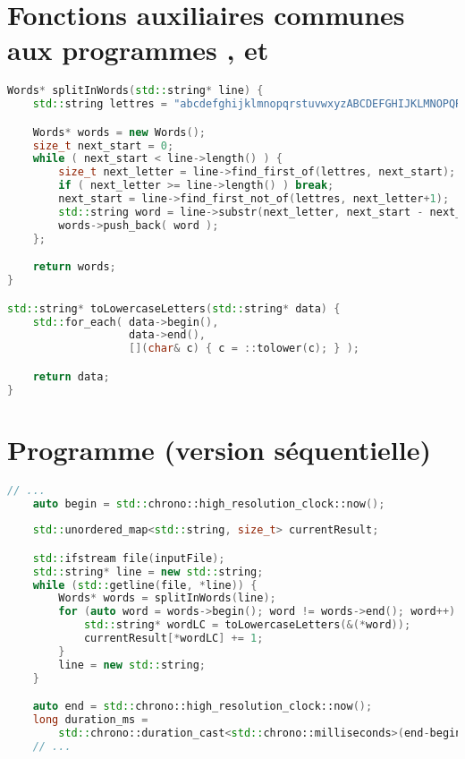 \newpage
\section{Fonctions auxiliaires communes aux programmes ,
 et }

\begin{lstlisting}[basicstyle=\ttfamily\footnotesize,language=c++]
Words* splitInWords(std::string* line) {
    std::string lettres = "abcdefghijklmnopqrstuvwxyzABCDEFGHIJKLMNOPQRSTUVWXYZ";

    Words* words = new Words();
    size_t next_start = 0;
    while ( next_start < line->length() ) {
        size_t next_letter = line->find_first_of(lettres, next_start);
        if ( next_letter >= line->length() ) break;
        next_start = line->find_first_not_of(lettres, next_letter+1);
        std::string word = line->substr(next_letter, next_start - next_letter); 
        words->push_back( word );
    };

    return words;
}

std::string* toLowercaseLetters(std::string* data) {
    std::for_each( data->begin(),
                   data->end(),
                   [](char& c) { c = ::tolower(c); } );

    return data;
}
\end{lstlisting}


\newpage
\section{Programme  (version séquentielle)}
\begin{lstlisting}[gobble=4,basicstyle=\ttfamily\footnotesize,language=c++]
	// ...
	auto begin = std::chrono::high_resolution_clock::now();
	
    std::unordered_map<std::string, size_t> currentResult;

    std::ifstream file(inputFile);
    std::string* line = new std::string;
    while (std::getline(file, *line)) {
        Words* words = splitInWords(line);
        for (auto word = words->begin(); word != words->end(); word++) {
            std::string* wordLC = toLowercaseLetters(&(*word));
            currentResult[*wordLC] += 1;
        }
        line = new std::string;
    }

    auto end = std::chrono::high_resolution_clock::now();
    long duration_ms = 
        std::chrono::duration_cast<std::chrono::milliseconds>(end-begin).count();
	// ...
\end{lstlisting}

